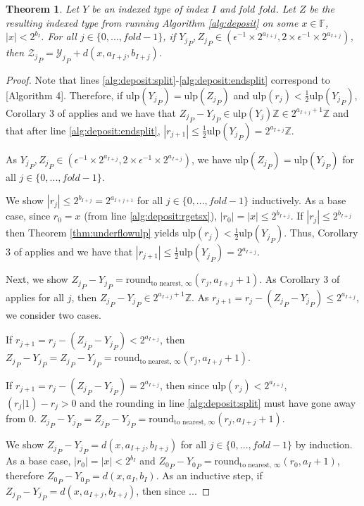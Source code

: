\documentclass[12pt]{article}
\providecommand{\F}{\ensuremath{\mathbb{F}}}
\providecommand{\Z}{\ensuremath{\mathbb{Z}}}
\providecommand{\ulp}{\ensuremath{\text{ulp}}}
\providecommand{\roundtonearestinfty}{\ensuremath{\text{round}_\text{to nearest, $\infty$}}}
\theoremstyle{plain}
\newtheorem{thm}{Theorem}[section]
\begin{document}
      \begin{thm}
        Let $Y$ be an indexed type of index $I$ and fold $fold$. Let $Z$ be the resulting indexed type from running Algorithm \ref{alg:deposit} on some $x \in \F$, $|x| < 2^{b_I}$. For all $j \in \{0, ..., fold - 1\}$, if ${Y_j}_P, {Z_j}_P \in (\epsilon^{-1} \times 2^{a_{I + j}}, 2 \times \epsilon^{-1} \times 2^{a_{I + j}})$, then ${\mathcal{Z}_j}_P = {\mathcal{Y}_j}_P + d(x, a_{I + j}, b_{I + j})$.
        \label{thm:ddeposit}
      \end{thm}
      \begin{proof}
        Note that lines \ref{alg:deposit:split}-\ref{alg:deposit:endsplit} correspond to \cite{repsum}[Algorithm 4].
        Therefore, if $\ulp({Y_j}_P) = \ulp({Z_j}_P)$ and $\ulp(r_j) < \frac{1}{2}\ulp({Y_j}_P)$, Corollary 3 of \cite{repsum} applies and we have that ${Z_j}_P - {Y_j}_P \in \ulp({Y_j})\Z \in 2^{a_{I + j} + 1}\Z$ and that after line \ref{alg:deposit:endsplit}, $|r_{j + 1}| \leq \frac{1}{2}\ulp({Y_j}_P) = 2^{a_{I + j}}\Z$.

        As ${Y_j}_P, {Z_j}_P \in (\epsilon^{-1} \times 2^{a_{I + j}}, 2 \times \epsilon^{-1} \times 2^{a_{I + j}})$, we have $\ulp({Z_j}_P) = \ulp({Y_j}_P)$ for all $j \in \{0, ..., fold - 1\}$.

        We show $|r_j| \leq 2^{b_{I + j}} = 2^{a_{I + j + 1}}$ for all $j \in \{0, ..., fold - 1\}$ inductively. As a base case, since $r_0 = x$ (from line \ref{alg:deposit:rgetsx}), $|r_0| = |x| \leq 2^{b_{I + j}}$. If $|r_j| \leq 2^{b_{I + j}}$ then Theorem \ref{thm:underflowulp} yields $\ulp(r_j) < \frac{1}{2}\ulp({Y_j}_P)$. Thus, Corollary 3 of \cite{repsum} applies and we have that $|r_{j + 1}| \leq \frac{1}{2}\ulp({Y_j}_P) = 2^{a_{I + j}}$.

        Next, we show ${Z_j}_P - {Y_j}_P = \roundtonearestinfty(r_j, a_{I + j} + 1)$. As Corollary 3 of \cite{repsum} applies for all $j$, then ${Z_j}_P - {Y_j}_P \in 2^{a_{I + j} + 1}\Z$. As $r_{j + 1} = r_j - ({Z_j}_P - {Y_j}_P) \leq 2^{a_{I + j}}$, we consider two cases.

        If $r_{j + 1} = r_j - ({Z_j}_P - {Y_j}_P) < 2^{a_{I + j}}$, then ${Z_j}_P - {Y_j}_P = {Z_j}_P - {Y_j}_P = \roundtonearestinfty(r_j, a_{I + j} + 1)$.

        If $r_{j + 1} = r_j - ({Z_j}_P - {Y_j}_P) = 2^{a_{I + j}}$, then since $\ulp(r_j) < 2^{a_{I + j}}$, $(r_j | 1) - r_j > 0$ and the rounding in line \ref{alg:deposit:split} must have gone away from 0. ${Z_j}_P - {Y_j}_P = {Z_j}_P - {Y_j}_P = \roundtonearestinfty(r_j, a_{I + j} + 1)$.

        We show ${Z_j}_P - {Y_j}_P = d(x, a_{I + j}, b_{I + j})$ for all $j \in \{0, ..., fold - 1\}$ by induction. As a base case, $|r_0| = |x| < 2^{b_I}$ and ${Z_0}_P - {Y_0}_P = \roundtonearestinfty(r_0, a_{I} + 1)$, therefore ${Z_0}_P - {Y_0}_P = d(x, a_I, b_I)$. As an inductive step, if ${Z_j}_P - {Y_j}_P = d(x, a_{I + j}, b_{I + j})$, then since ...
      \end{proof}
\end{document}
